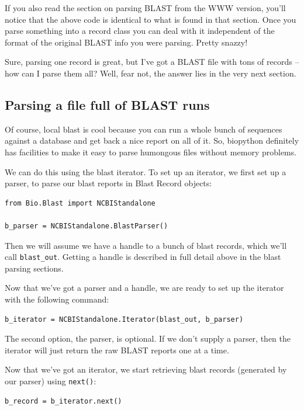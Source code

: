 \documentclass{report}
\begin{document}
If you also read the section on parsing BLAST from the WWW version, you'll notice that the above code is identical to what is found in that section. Once you parse something into a record class you can deal with it independent of the format of the original BLAST info you were parsing. Pretty snazzy!


Sure, parsing one record is great, but I've got a BLAST file with tons of records -- how can I parse them all? Well, fear not, the answer lies in the very next section.

\subsection{Parsing a file full of BLAST runs}

Of course, local blast is cool because you can run a whole bunch of sequences against a database and get back a nice report on all of it. So, biopython definitely has facilities to make it easy to parse humongous files without memory problems. 


We can do this using the blast iterator. To set up an iterator, we first set up a parser, to parse our blast reports in Blast Record objects:

\begin{verbatim}
from Bio.Blast import NCBIStandalone

b_parser = NCBIStandalone.BlastParser()
\end{verbatim}

Then we will assume we have a handle to a bunch of blast records, which we'll call \verb|blast_out|. Getting a handle is described in full detail above in the blast parsing sections. 


Now that we've got a parser and a handle, we are ready to set up the iterator with the following command:

\begin{verbatim}
b_iterator = NCBIStandalone.Iterator(blast_out, b_parser)
\end{verbatim}

The second option, the parser, is optional. If we don't supply a parser, then the iterator will just return the raw BLAST reports one at a time.


Now that we've got an iterator, we start retrieving blast records (generated by our parser) using \verb|next()|:

\begin{verbatim}
b_record = b_iterator.next()
\end{verbatim}
\end{document}
